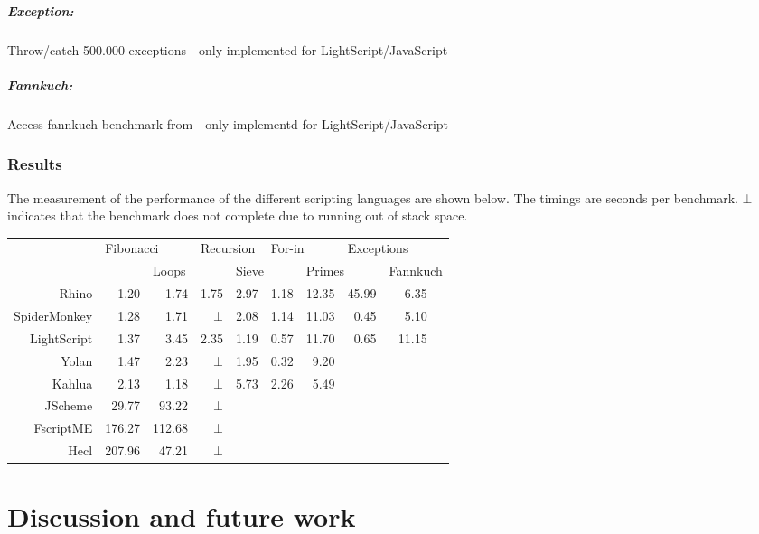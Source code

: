 \documentclass[11pt]{report}
\begin{document}
\paragraph{Exception:} Throw/catch 500.000 exceptions - only implemented for LightScript/JavaScript
\paragraph{Fannkuch:} Access-fannkuch benchmark from \cite{sunspider, shootout} - only implementd for LightScript/JavaScript

\subsection{Results}
The measurement of the performance of the different scripting languages are shown below. The timings are seconds per benchmark. $\bot$ indicates that the benchmark does not complete due to running out of stack space.

\begin{center} \begin{tabular}{|r|r|r|r|r|r|r|r|rr|} \hline 
& \multicolumn{2}{|l|}{Fibonacci} & \multicolumn{2}{|l|}{Recursion} & \multicolumn{2}{|l|}{For-in} & \multicolumn{2}{|l}{Exceptions} & \\
& & \multicolumn{2}{|l|}{Loops} & \multicolumn{2}{|l|}{Sieve} & \multicolumn{2}{|l|}{Primes} & \multicolumn{2}{|l|}{Fannkuch} \\
\hline Rhino       & 1.20 & 1.74 & 1.75   & 2.97 & 1.18 & 12.35 & 45.99 & 6.35 & \\ 
\hline SpiderMonkey& 1.28 & 1.71 & $\bot$ & 2.08 & 1.14 & 11.03 & 0.45  & 5.10 & \\ 
\hline LightScript & 1.37 & 3.45 & 2.35   & 1.19 & 0.57 & 11.70 & 0.65  & 11.15 & \\
\hline Yolan       & 1.47 & 2.23 & $\bot$ & 1.95 & 0.32 &  9.20 &  &  & \\
\hline Kahlua      & 2.13 & 1.18 & $\bot$ &  5.73 & 2.26 & 5.49 &  &  & \\ 
\hline JScheme    & 29.77 & 93.22 & $\bot$ & & & & & & \\ 
\hline FscriptME & 176.27 & 112.68& $\bot$ & & & & & & \\ 
\hline Hecl      & 207.96 & 47.21 & $\bot$ & & & & & & \\ 
\hline \end{tabular}
\end{center} 

\chapter{Discussion and future work}
\label{discussion}
\end{document}
